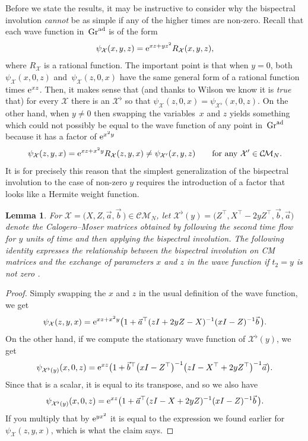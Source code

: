 \documentclass[pdftex]{sigma}
\numberwithin{equation}{section}
\newtheorem{Lemma}[Theorem]{Lemma}
\theoremstyle{definition}
\def\X{\mathcal{X}}
\def\CM{\mathcal{C\!M}}
\begin{document}
Before we state the results, it may be instructive to consider why the
bispectral involution \textit{cannot} be as simple if any of the
higher times are non-zero. Recall that each wave function in~${\rm Gr}^{\rm ad}$ is of the form
\[
\psi_{\X}(x,y,z)={\rm e}^{xz + y z^2}R_{\X}(x,y,z),
\]
where $R_{\X}$ is a rational function.
The important point is that when $y=0$, both $\psi_{\X}(x,0,z)$ and~$\psi_{\X}(z,0,x)$
have the same general form of a rational function times ${\rm e}^{xz}$.
Then, it makes sense that (and thanks to Wilson \cite{WilsonBisp,WilsonCM} we
know it is \textit{true} that) for every $\X$ there is an $\X^{\flat}$
so that $\psi_{\X}(z,0,x)=\psi_{\X^{\flat}}(x,0,z)$. On the other
hand, when $y\not=0$ then swapping the variables~$x$ and $z$ yields
something which could not possibly be equal to the wave function of
any point in~${\rm Gr}^{\rm ad}$ because it has a factor of ${\rm e}^{x^2y}$
\[
\psi_{\X}(z,y,x)={\rm e}^{xz+x^2y}R_{\X}(z,y,x)\not=\psi_{\X'}(x,y,z) \qquad\text{for
any}\ \X'\in\CM_N.
\]
It is for precisely this reason that
 the simplest
generalization of the bispectral involution to the case of non-zero $y$ requires the
introduction of a
factor that looks like a Hermite weight function.

\begin{Lemma}\label{lem:bispy}
For $\X=\bigl(X,Z,\vec a,\vec b\,\bigr)\in\CM_N$, let
$\X^{\flat}(y)=\bigl(Z^{\top},X^{\top}-2yZ^{\top},\vec b,\vec a\bigr)$ denote
the Calogero--Moser matrices obtained by following the second time flow
for $y$ units of time and then applying the bispectral involution.
The following identity expresses the
relationship between the bispectral involution on CM matrices and the
exchange of parameters $x$ and $z$ in the wave function if $t_2=y$ is not zero
\smash{$%
\psi_{\X}(z,y,x)={\rm e}^{yx^2}\psi_{\X^{\flat}(y)}(x,0,z)$}.
\end{Lemma}
\begin{proof}
Simply swapping the $x$ and $z$ in the usual definition of the wave
function, we get
\[
 \psi_{\X}(z,y,x)={\rm e}^{xz+x^2y}\bigl(1+\vec
 a^{\top}(zI+2yZ-X)^{-1}(xI-Z)^{-1}\vec b\,\bigr).
\]
On the other hand, if we compute the stationary wave function of
$\X^{\flat}(y)$, we get
\[
\psi_{\X^\flat(y)}(x,0,z)={\rm e}^{xz}\bigl(1+\vec b^\top
 \bigl(xI-Z^\top\bigr)^{-1}\bigl(zI-X^\top+2yZ^\top\bigr)^{-1}\vec a\bigr).
\]
Since that is a scalar, it is equal to its transpose, and so we also
have
\[
\psi_{\X^\flat(y)}(x,0,z)={\rm e}^{xz}\bigl(1+\vec a^\top
 (zI-X+2yZ)^{-1}(xI-Z)^{-1}\vec b\,\bigr).
\]
If you multiply that by ${\rm e}^{yx^2}$ it is equal to the
expression we found earlier for $\psi_{\X}(z,y,x)$, which is what the
claim says.
\end{proof}
\end{document}
